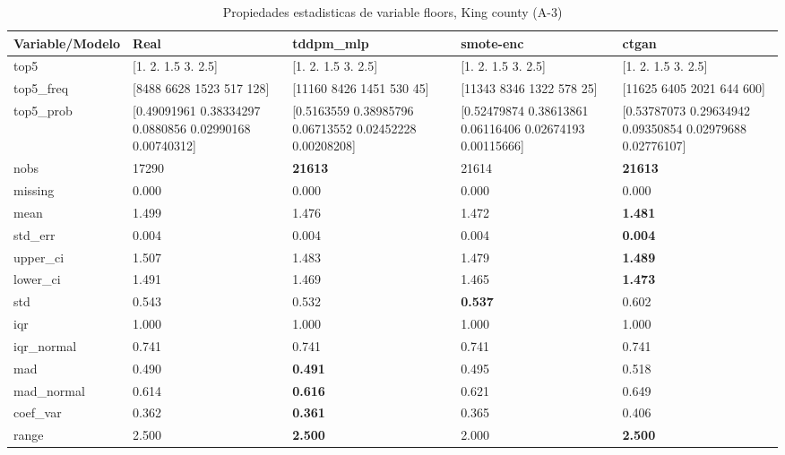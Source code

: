 \begin{table}[H]
\centering
\fontsize{8}{14}\selectfont
\caption{Propiedades  estadisticas de variable floors, King county (A-3)}
\label{table-stats-king county-a-3-floors}
\begin{tabular}{|l|m{10em}|m{10em}|m{10em}|m{10em}|}
\hline
 \rowcolor[gray]{0.8}
Variable/Modelo & Real & tddpm\_mlp & smote-enc & ctgan \\
\hline top5 & [1.  2.  1.5 3.  2.5] & [1.  2.  1.5 3.  2.5] & [1.  2.  1.5 3.  2.5] & [1.  2.  1.5 3.  2.5] \\
\hline top5\_freq & [8488 6628 1523  517  128] & [11160  8426  1451   530    45] & [11343  8346  1322   578    25] & [11625  6405  2021   644   600] \\
\hline top5\_prob & [0.49091961 0.38334297 0.0880856  0.02990168 0.00740312] & [0.5163559  0.38985796 0.06713552 0.02452228 0.00208208] & [0.52479874 0.38613861 0.06116406 0.02674193 0.00115666] & [0.53787073 0.29634942 0.09350854 0.02979688 0.02776107] \\
\hline nobs & 17290 & \bfseries 21613 & \cellcolor[rgb]{0.9, 0.54, 0.52} 21614 & \bfseries 21613 \\
\hline missing & 0.000 & 0.000 & 0.000 & 0.000 \\
\hline mean & 1.499 & 1.476 & \cellcolor[rgb]{0.9, 0.54, 0.52} 1.472 & \bfseries 1.481 \\
\hline std\_err & 0.004 & \cellcolor[rgb]{0.9, 0.54, 0.52} 0.004 & 0.004 & \bfseries 0.004 \\
\hline upper\_ci & 1.507 & 1.483 & \cellcolor[rgb]{0.9, 0.54, 0.52} 1.479 & \bfseries 1.489 \\
\hline lower\_ci & 1.491 & 1.469 & \cellcolor[rgb]{0.9, 0.54, 0.52} 1.465 & \bfseries 1.473 \\
\hline std & 0.543 & 0.532 & \bfseries 0.537 & \cellcolor[rgb]{0.9, 0.54, 0.52} 0.602 \\
\hline iqr & 1.000 & 1.000 & 1.000 & 1.000 \\
\hline iqr\_normal & 0.741 & 0.741 & 0.741 & 0.741 \\
\hline mad & 0.490 & \bfseries 0.491 & 0.495 & \cellcolor[rgb]{0.9, 0.54, 0.52} 0.518 \\
\hline mad\_normal & 0.614 & \bfseries 0.616 & 0.621 & \cellcolor[rgb]{0.9, 0.54, 0.52} 0.649 \\
\hline coef\_var & 0.362 & \bfseries 0.361 & 0.365 & \cellcolor[rgb]{0.9, 0.54, 0.52} 0.406 \\
\hline range & 2.500 & \bfseries 2.500 & \cellcolor[rgb]{0.9, 0.54, 0.52} 2.000 & \bfseries 2.500 \\

\end{tabular}
\end{table}
